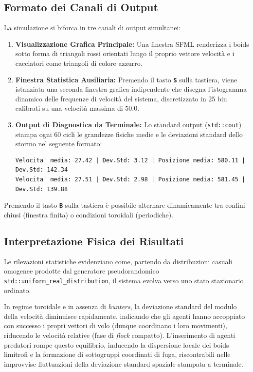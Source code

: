 \documentclass[11pt, a4paper]{article}
\begin{document}
\subsection{Formato dei Canali di Output}
La simulazione si biforca in tre canali di output simultanei:
\begin{enumerate}
    \item \textbf{Visualizzazione Grafica Principale:} Una finestra SFML renderizza i boids sotto forma di triangoli rossi orientati lungo il proprio vettore velocità e i cacciatori come triangoli di colore azzurro.
    \item \textbf{Finestra Statistica Ausiliaria:} Premendo il tasto \textbf{\texttt{S}} sulla tastiera, viene istanziata una seconda finestra grafica indipendente che disegna l'istogramma dinamico delle frequenze di velocità del sistema, discretizzato in 25 bin calibrati su una velocità massima di $50.0$.
    \item \textbf{Output di Diagnostica da Terminale:} Lo standard output (\texttt{std::cout}) stampa ogni 60 cicli le grandezze fisiche medie e le deviazioni standard dello stormo nel seguente formato:
\begin{lstlisting}
Velocita' media: 27.42 | Dev.Std: 3.12 | Posizione media: 580.11 | Dev.Std: 142.34
Velocita' media: 27.51 | Dev.Std: 2.98 | Posizione media: 581.45 | Dev.Std: 139.88
\end{lstlisting}
\end{enumerate}
Premendo il tasto \textbf{\texttt{B}} sulla tastiera è possibile alternare dinamicamente tra confini chiusi (finestra finita) o condizioni toroidali (periodiche).

\subsection{Interpretazione Fisica dei Risultati}
Le rilevazioni statistiche evidenziano come, partendo da distribuzioni casuali omogenee prodotte dal generatore pseudorandomico \texttt{std::uniform\_real\_distribution}, il sistema evolva verso uno stato stazionario ordinato. 

In regime toroidale e in assenza di \textit{hunters}, la deviazione standard del modulo della velocità diminuisce rapidamente, indicando che gli agenti hanno accoppiato con successo i propri vettori di volo (dunque coordinano i loro movimenti), riducendo le velocità relative (fase di \textit{flock} compatto). L'inserimento di agenti predatori rompe questo equilibrio, inducendo la dispersione locale dei boids limitrofi e la formazione di sottogruppi coordinati di fuga, riscontrabili nelle improvvise fluttuazioni della deviazione standard spaziale stampata a terminale.
\end{document}
